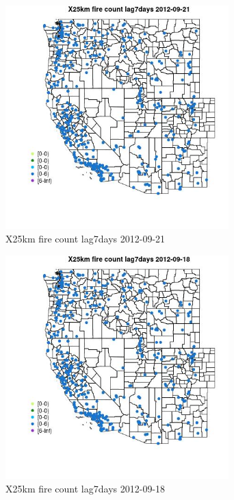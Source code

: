 \begin{figure} 
\centering  
\includegraphics[width=0.77\textwidth]{Code_Outputs/Report_ML_input_PM25_Step4_part_e_de_duplicated_aves_compiled_2019-05-14wNAs_MapObsX25km_fire_count_lag7days2012-09-21.jpg} 
\caption{\label{fig:Report_ML_input_PM25_Step4_part_e_de_duplicated_aves_compiled_2019-05-14wNAsMapObsX25km_fire_count_lag7days2012-09-21}X25km fire count lag7days 2012-09-21} 
\end{figure} 
 

\begin{figure} 
\centering  
\includegraphics[width=0.77\textwidth]{Code_Outputs/Report_ML_input_PM25_Step4_part_e_de_duplicated_aves_compiled_2019-05-14wNAs_MapObsX25km_fire_count_lag7days2012-09-18.jpg} 
\caption{\label{fig:Report_ML_input_PM25_Step4_part_e_de_duplicated_aves_compiled_2019-05-14wNAsMapObsX25km_fire_count_lag7days2012-09-18}X25km fire count lag7days 2012-09-18} 
\end{figure} 
 

